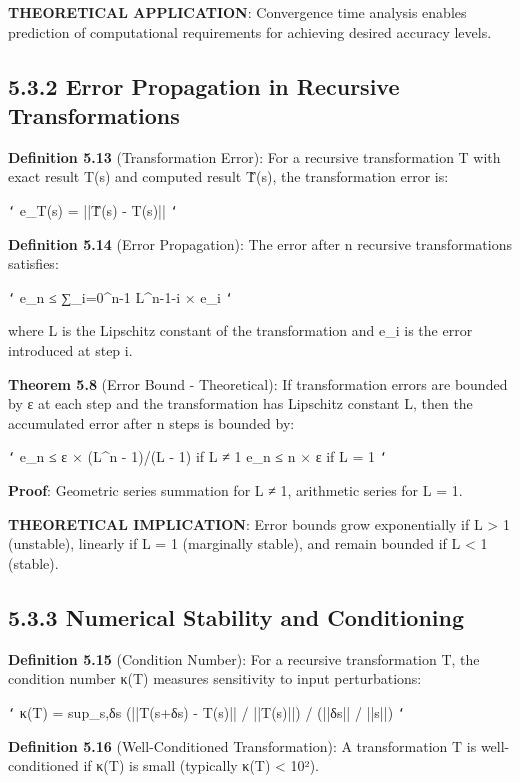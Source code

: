 \textbf{THEORETICAL APPLICATION}: Convergence time analysis enables prediction of computational requirements for achieving desired accuracy levels.

\subsection{5.3.2 Error Propagation in Recursive Transformations}

\textbf{Definition 5.13} (Transformation Error): For a recursive transformation T with exact result T(s) and computed result T̃(s), the transformation error is:

\texttt{`}
e_T(s) = ||T̃(s) - T(s)||
\texttt{`}

\textbf{Definition 5.14} (Error Propagation): The error after n recursive transformations satisfies:

\texttt{`}
e_n ≤ ∑_{i=0}^{n-1} L^{n-1-i} × e_i
\texttt{`}

where L is the Lipschitz constant of the transformation and e_i is the error introduced at step i.

\textbf{Theorem 5.8} (Error Bound - Theoretical): If transformation errors are bounded by ε at each step and the transformation has Lipschitz constant L, then the accumulated error after n steps is bounded by:

\texttt{`}
e_n ≤ ε × (L^n - 1)/(L - 1)  if L ≠ 1
e_n ≤ n × ε                   if L = 1
\texttt{`}

\textbf{Proof}: Geometric series summation for L ≠ 1, arithmetic series for L = 1.

\textbf{THEORETICAL IMPLICATION}: Error bounds grow exponentially if L > 1 (unstable), linearly if L = 1 (marginally stable), and remain bounded if L < 1 (stable).

\subsection{5.3.3 Numerical Stability and Conditioning}

\textbf{Definition 5.15} (Condition Number): For a recursive transformation T, the condition number κ(T) measures sensitivity to input perturbations:

\texttt{`}
κ(T) = sup_{s,δs} (||T(s+δs) - T(s)|| / ||T(s)||) / (||δs|| / ||s||)
\texttt{`}

\textbf{Definition 5.16} (Well-Conditioned Transformation): A transformation T is well-conditioned if κ(T) is small (typically κ(T) < 10²).

